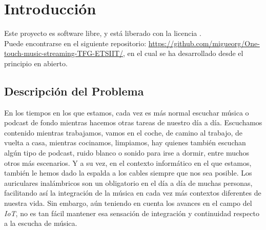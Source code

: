 \chapter{Introducción}

Este proyecto es software libre, y está liberado con la licencia \cite{gplv3}.\\

Puede encontrarse en el siguiente repositorio: \url{https://github.com/migueorg/One-touch-music-streaming-TFG-ETSIIT/}, en el cual se ha desarrollado desde el principio en abierto.

\section{Descripción del Problema}
En los tiempos en los que estamos, cada vez es más normal escuchar música o podcast de fondo mientras hacemos otras tareas de nuestro día a día. Escuchamos contenido mientras trabajamos, vamos en el coche, de camino al trabajo, de vuelta a casa, mientras cocinamos, limpiamos, hay quienes también escuchan algún tipo de podcast, ruido blanco o sonido para irse a dormir, entre muchos otros más escenarios. Y a su vez, en el contexto informático en el que estamos, también le hemos dado la espalda a los cables siempre que nos sea posible. Los auriculares inalámbricos son un obligatorio en el día a día de muchas personas, facilitando así la integración de la música en cada vez más contextos diferentes de nuestra vida. Sin embargo, aún teniendo en cuenta los avances en el campo del \emph{IoT}, no es tan fácil mantener esa sensación de integración y continuidad respecto a la escucha de música.\\

